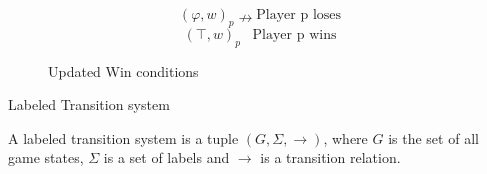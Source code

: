 \documentclass[a4paper,american]{paper}
\begin{document}
\begin{figure}[H]
	\centering
	\begin{equation}
		(\varphi ,w)_{p}\nrightarrow\text{Player p loses}
	\end{equation}
	\begin{equation}
		(\top ,w)_{p}\hspace{10pt}\text{Player p wins}
	\end{equation}
	\caption{Updated Win conditions}
	\label{fig:win_rules}
\end{figure}
Labeled Transition system
\begin{definition}
A labeled transition system is a tuple $(G,\Sigma ,\rightarrow )$, where $G$ is the set of all game states, $\Sigma$ is a set of labels and $\rightarrow$ is a transition relation.
\end{definition}
\end{document}
